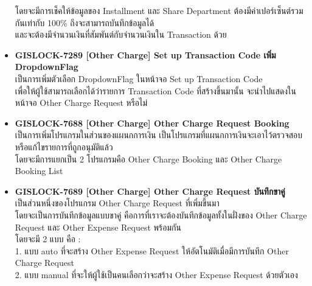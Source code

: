 \begin{itemize}
          โดยจะมีการเช็คให้ข้อมูลของ Installment และ Share Department ต้องมีค่าเปอร์เซ็นต์รวมกันเท่ากับ 100\% ถึงจะสามารถบันทึกข้อมูลได้ \\
          และจะต้องมีจำนวนเงินที่สัมพันต์กับจำนวนเงินใน Transaction ด้วย
    \item \textbf{{GISLOCK-7289 [Other Charge] Set up Transaction Code เพิ่ม DropdownFlag}} \\
          เป็นการเพิ่มตัวเลือก DropdownFlag ในหน้าจอ Set up Transaction Code \\
          เพื่อให้ผู้ใช้สามารถเลือกได้ว่ารายการ Transaction Code ที่สร้างขึ้นมานั้น จะนำไปแสดงในหน้าจอ Other Charge Request หรือไม่
    \item \textbf{{GISLOCK-7688 [Other Charge] Other Charge Request Booking}} \\
          เป็นการเพิ่มโปรแกรมในส่วนของแผนกการเงิน เป็นโปรแกรมที่แผนกการเงินจะเอาไว้ตรวจสอบหรือแก้ไขรายการที่ถูกอนุมัติแล้ว \\
          โดยจะมีการแยกเป็น 2 โปรแกรมคือ Other Charge Booking และ Other Charge Booking List
    \item \textbf{{GISLOCK-7689 [Other Charge] Other Charge Request บันทึกขาคู่}} \\
          เป็นส่วนหนึ่งของโปรแกรม Other Charge Request ที่เพิ่มขึ้นมา \\
          โดยจะเป็นการบันทึกข้อมูลแบบขาคู่ คือการที่เราจะต้องบันทึกข้อมูลทั้งในฝั่งของ Other Charge Request และ Other Expense Request พร้อมกัน \\
          โดยจะมี 2 แบบ คือ : \\
            1. แบบ auto ที่จะสร้าง Other Expense Request ให้อัตโนมัติเมื่อมีการบันทึก Other Charge Request \\
            2. แบบ manual ที่จะให้ผู้ใช้เป็นคนเลือกว่าจะสร้าง Other Expense Request ด้วยตัวเอง
\end{itemize}

